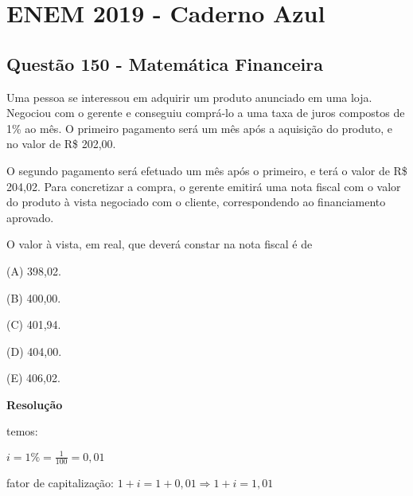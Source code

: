 \chapter{ENEM 2019 - Caderno Azul}

\section{Questão 150 - Matemática Financeira}

Uma pessoa se interessou em adquirir um produto anunciado em uma loja. Negociou com o gerente e conseguiu comprá-lo a uma taxa de juros compostos de 1\% ao mês. O primeiro pagamento será um mês após a aquisição do produto, e no valor de R\$ 202,00.

O segundo pagamento será efetuado um mês após o primeiro, e terá o valor de R\$ 204,02. Para concretizar a compra, o gerente emitirá uma nota fiscal com o valor do produto à vista negociado com o cliente, correspondendo ao financiamento aprovado.

O valor à vista, em real, que deverá constar na nota fiscal é de

(A) 398,02.

(B) 400,00.

(C) 401,94.

(D) 404,00.

(E) 406,02.

\textbf{Resolução}

temos: 

$ i = 1\% = \frac{1}{100} = 0,01 $

fator de capitalização: $ 1 + i = 1 + 0,01 \Longrightarrow 1 + i = 1,01 $


